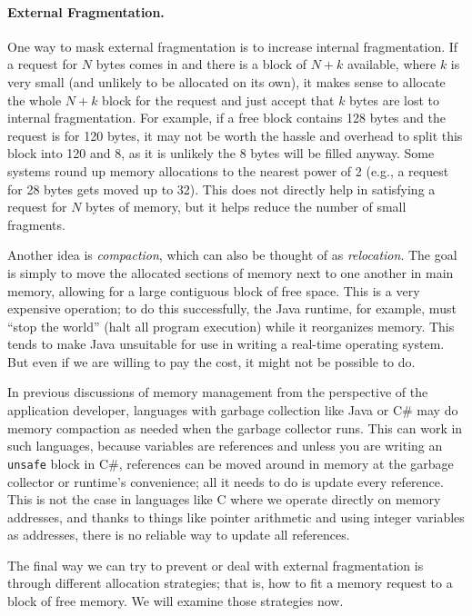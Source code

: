 \paragraph{External Fragmentation.}
One way to mask external fragmentation is to increase internal fragmentation. If a request for $N$ bytes comes in and there is a block of $N+k$ available, where $k$ is very small (and unlikely to be allocated on its own), it makes sense to allocate the whole $N+k$ block for the request and just accept that $k$ bytes are lost to internal fragmentation. For example, if a free block contains 128 bytes and the request is for 120 bytes, it may not be worth the hassle and overhead to split this block into 120 and 8, as it is unlikely the 8 bytes will be filled anyway. Some systems round up memory allocations to the nearest power of 2 (e.g., a request for 28 bytes gets moved up to 32). This does not directly help in satisfying a request for $N$ bytes of memory, but it helps reduce the number of small fragments.

Another idea is \textit{compaction}, which can also be thought of as \textit{relocation}. The goal is simply to move the allocated sections of memory next to one another in main memory, allowing for a large contiguous block of free space. This is a very expensive operation; to do this successfully, the Java runtime, for example, must ``stop the world'' (halt all program execution) while it reorganizes memory. This tends to make Java unsuitable for use in writing a real-time operating system. But even if we are willing to pay the cost, it might not be possible to do.

In previous discussions of memory management from the perspective of the application developer, languages with garbage collection like Java or C\# may do memory compaction as needed when the garbage collector runs. This can work in such languages, because variables are references and unless you are writing an \texttt{unsafe} block in C\#, references can be moved around in memory at the garbage collector or runtime's convenience; all it needs to do is update every reference. This is not the case in languages like C where we operate directly on memory addresses, and thanks to things like pointer arithmetic and using integer variables as addresses, there is no reliable way to update all references. 

The final way we can try to prevent or deal with external fragmentation is through different allocation strategies; that is, how to fit a memory request to a block of free memory. We will examine those strategies now.

